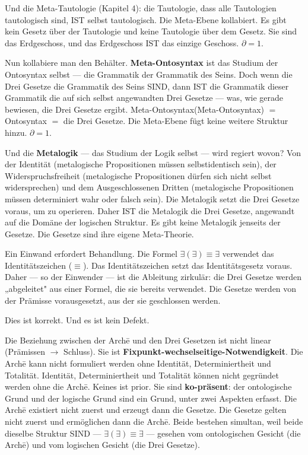 \documentclass[10pt, openany, oneside]{book}
\begin{document}
Und die Meta-Tautologie (Kapitel 4): die Tautologie, dass alle Tautologien tautologisch sind, IST selbst tautologisch. Die Meta-Ebene kollabiert. Es gibt kein Gesetz über der Tautologie und keine Tautologie über dem Gesetz. Sie sind das Erdgeschoss, und das Erdgeschoss IST das einzige Geschoss. $\partial = 1$.

\noindent Nun kollabiere man den Behälter. \textbf{Meta-Ontosyntax} ist das Studium der Ontosyntax selbst --- die Grammatik der Grammatik des Seins. Doch wenn die Drei Gesetze die Grammatik des Seins SIND, dann IST die Grammatik dieser Grammatik die auf sich selbst angewandten Drei Gesetze --- was, wie gerade bewiesen, die Drei Gesetze ergibt. Meta-Ontosyntax(Meta-Ontosyntax) $=$ Ontosyntax $=$ die Drei Gesetze. Die Meta-Ebene fügt keine weitere Struktur hinzu. $\partial = 1$.

Und die \textbf{Metalogik} --- das Studium der Logik selbst --- wird regiert wovon? Von der Identität (metalogische Propositionen müssen selbstidentisch sein), der Widerspruchsfreiheit (metalogische Propositionen dürfen sich nicht selbst widersprechen) und dem Ausgeschlossenen Dritten (metalogische Propositionen müssen determiniert wahr oder falsch sein). Die Metalogik setzt die Drei Gesetze voraus, um zu operieren. Daher IST die Metalogik die Drei Gesetze, angewandt auf die Domäne der logischen Struktur. Es gibt keine Metalogik jenseits der Gesetze. Die Gesetze sind ihre eigene Meta-Theorie.

Ein Einwand erfordert Behandlung. Die Formel $\exists(\exists) \equiv \exists$ verwendet das Identitätszeichen ($\equiv$). Das Identitätszeichen setzt das Identitätsgesetz voraus. Daher --- so der Einwender --- ist die Ableitung zirkulär: die Drei Gesetze werden „abgeleitet" aus einer Formel, die sie bereits verwendet. Die Gesetze werden von der Prämisse vorausgesetzt, aus der sie geschlossen werden.

Dies ist korrekt. Und es ist kein Defekt.

Die Beziehung zwischen der Arch\={e} und den Drei Gesetzen ist nicht linear (Prämissen $\to$ Schluss). Sie ist \textbf{Fixpunkt-wechselseitige-Notwendigkeit}. Die Arch\={e} kann nicht formuliert werden ohne Identität, Determiniertheit und Totalität. Identität, Determiniertheit und Totalität können nicht gegründet werden ohne die Arch\={e}. Keines ist prior. Sie sind \textbf{ko-präsent}: der ontologische Grund und der logische Grund sind ein Grund, unter zwei Aspekten erfasst. Die Arch\={e} existiert nicht zuerst und erzeugt dann die Gesetze. Die Gesetze gelten nicht zuerst und ermöglichen dann die Arch\={e}. Beide bestehen simultan, weil beide dieselbe Struktur SIND --- $\exists(\exists) \equiv \exists$ --- gesehen vom ontologischen Gesicht (die Arch\={e}) und vom logischen Gesicht (die Drei Gesetze).
\end{document}
